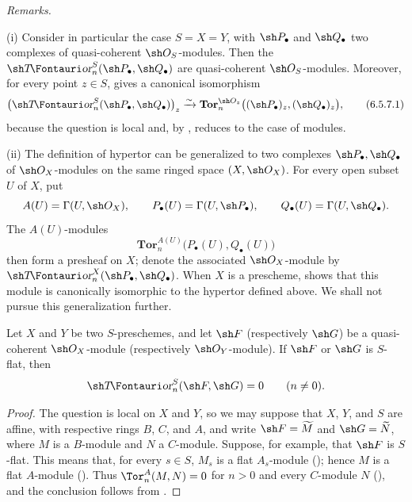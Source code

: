 \begin{env}[6.5.7]
\label{III.6.5.7}
\emph{Remarks.}

\textnormal{(i)} Consider in particular the case $S=X=Y$, with
$\sh P_\bullet$ and $\sh Q_\bullet$ two complexes of
quasi-coherent $\sh O_S$-modules.  Then the
$\shTor_n^S(\sh P_\bullet,\sh Q_\bullet)$ are quasi-coherent
$\sh O_S$-modules.  Moreover, for every point $z\in S$,
 gives a canonical isomorphism
\[
  \bigl(\shTor_n^S(\sh P_\bullet,\sh Q_\bullet)\bigr)_z
  \xrightarrow{\sim}
  \mathbf{Tor}_n^{\sh O_z}
  \bigl((\sh P_\bullet)_z,(\sh Q_\bullet)_z\bigr),
  \tag{6.5.7.1}\label{III.6.5.7.1}
\]
because the question is local and, by ,
reduces to the case of modules.

\textnormal{(ii)} The definition of hypertor can be generalized
to two complexes $\sh P_\bullet,\sh Q_\bullet$ of
$\sh O_X$-modules on the same ringed space $(X,\sh O_X)$.  For
every open subset $U$ of $X$, put
\[
  A(U)=\Gamma(U,\sh O_X),\qquad
  P_\bullet(U)=\Gamma(U,\sh P_\bullet),\qquad
  Q_\bullet(U)=\Gamma(U,\sh Q_\bullet).
\]
The $A(U)$-modules
\[
  \mathbf{Tor}_n^{A(U)}\bigl(P_\bullet(U),Q_\bullet(U)\bigr)
\]
then form a presheaf on $X$; denote the associated
$\sh O_X$-module by
$\shTor_n^X(\sh P_\bullet,\sh Q_\bullet)$.  When $X$ is a
prescheme,  shows that this module is
canonically isomorphic to the hypertor defined above.  We shall
not pursue this generalization further.
\end{env}

\begin{proposition}[6.5.8]
\label{III.6.5.8}
Let $X$ and $Y$ be two $S$-preschemes, and let $\sh F$
(respectively $\sh G$) be a quasi-coherent $\sh O_X$-module
(respectively $\sh O_Y$-module).  If $\sh F$ or $\sh G$ is
$S$-flat, then
\[
  \shTor_n^S(\sh F,\sh G)=0\qquad(n\ne0).
\]
\end{proposition}

\begin{proof}
The question is local on $X$ and $Y$, so we may suppose that
$X$, $Y$, and $S$ are affine, with respective rings $B$, $C$,
and $A$, and write $\sh F=\widetilde M$ and
$\sh G=\widetilde N$, where $M$ is a $B$-module and $N$ a
$C$-module.  Suppose, for example, that $\sh F$ is $S$-flat.
This means that, for every $s\in S$, $M_s$ is a flat
$A_s$-module (); hence $M$ is a flat
$A$-module ().  Thus
$\Tor_n^A(M,N)=0$ for $n>0$ and every $C$-module $N$
(), and the conclusion follows from
.
\end{proof}

